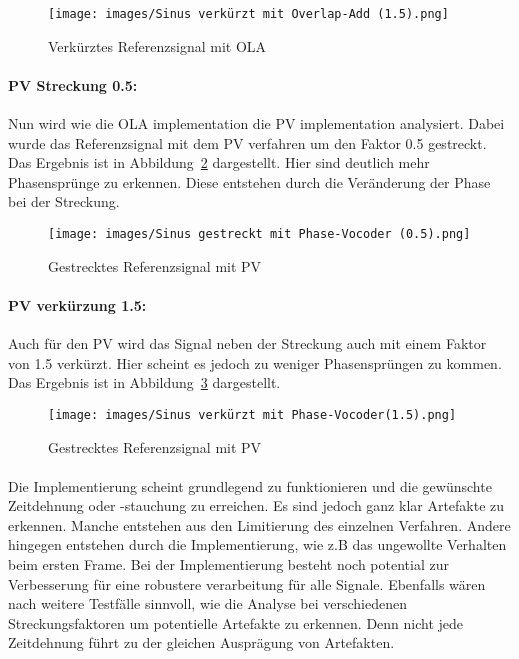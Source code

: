 \begin{figure}[H]
    \centering
    \texttt{[image: images/Sinus verkürzt mit Overlap-Add (1.5).png]}
    \caption{Verkürztes Referenzsignal mit OLA}
    \label{fig:ola15}
\end{figure}

\paragraph{PV Streckung 0.5:}
Nun wird wie die OLA implementation die PV implementation analysiert. Dabei wurde das Referenzsignal mit dem PV verfahren um den Faktor 0.5 gestreckt. Das Ergebnis ist in Abbildung~\ref{fig:pv05} dargestellt. Hier sind deutlich mehr Phasensprünge zu erkennen. Diese entstehen durch die Veränderung der Phase bei der Streckung. 

\begin{figure}[H]
    \centering
    \texttt{[image: images/Sinus gestreckt mit Phase-Vocoder (0.5).png]}
    \caption{Gestrecktes Referenzsignal mit PV}
    \label{fig:pv05}
\end{figure}

\paragraph{PV verkürzung 1.5:}
Auch für den PV wird das Signal neben der Streckung auch mit einem Faktor von 1.5 verkürzt. Hier scheint es jedoch zu weniger Phasensprüngen zu kommen. Das Ergebnis ist in Abbildung~\ref{fig:pv15} dargestellt. 
\begin{figure}[H]
    \centering
    \texttt{[image: images/Sinus verkürzt mit Phase-Vocoder(1.5).png]}
    \caption{Gestrecktes Referenzsignal mit PV}
    \label{fig:pv15}
\end{figure}

\paragraph{}
Die Implementierung scheint grundlegend zu funktionieren und die gewünschte Zeitdehnung oder -stauchung zu erreichen. Es sind jedoch ganz klar Artefakte zu erkennen. Manche entstehen aus den Limitierung des einzelnen Verfahren. Andere hingegen entstehen durch die Implementierung, wie z.B das ungewollte Verhalten beim ersten Frame. Bei der Implementierung besteht noch potential zur Verbesserung für eine robustere verarbeitung für alle Signale. Ebenfalls wären nach weitere Testfälle sinnvoll, wie die Analyse bei verschiedenen Streckungsfaktoren um potentielle Artefakte zu erkennen. Denn nicht jede Zeitdehnung führt zu der gleichen Ausprägung von Artefakten. 

